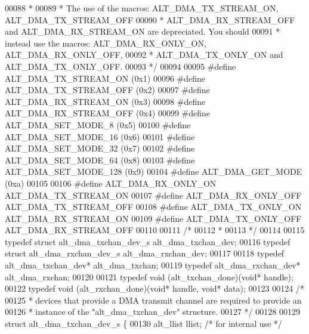 \begin{DoxyCode}
00088 \textcolor{comment}{ *}
00089 \textcolor{comment}{ * The use of the macros: ALT\_DMA\_TX\_STREAM\_ON, ALT\_DMA\_TX\_STREAM\_OFF}
00090 \textcolor{comment}{ * ALT\_DMA\_RX\_STREAM\_OFF and ALT\_DMA\_RX\_STREAM\_ON are depreciated. You should}
00091 \textcolor{comment}{ * instead use the macros: ALT\_DMA\_RX\_ONLY\_ON, ALT\_DMA\_RX\_ONLY\_OFF, }
00092 \textcolor{comment}{ * ALT\_DMA\_TX\_ONLY\_ON and ALT\_DMA\_TX\_ONLY\_OFF.}
00093 \textcolor{comment}{ */}
00094 
00095 \textcolor{preprocessor}{#define ALT\_DMA\_TX\_STREAM\_ON  (0x1)}
00096 \textcolor{preprocessor}{#define ALT\_DMA\_TX\_STREAM\_OFF (0x2)}
00097 \textcolor{preprocessor}{#define ALT\_DMA\_RX\_STREAM\_ON  (0x3)}
00098 \textcolor{preprocessor}{#define ALT\_DMA\_RX\_STREAM\_OFF (0x4)}
00099 \textcolor{preprocessor}{#define ALT\_DMA\_SET\_MODE\_8    (0x5)}
00100 \textcolor{preprocessor}{#define ALT\_DMA\_SET\_MODE\_16   (0x6)}
00101 \textcolor{preprocessor}{#define ALT\_DMA\_SET\_MODE\_32   (0x7)}
00102 \textcolor{preprocessor}{#define ALT\_DMA\_SET\_MODE\_64   (0x8)}
00103 \textcolor{preprocessor}{#define ALT\_DMA\_SET\_MODE\_128  (0x9)}
00104 \textcolor{preprocessor}{#define ALT\_DMA\_GET\_MODE      (0xa)}
00105 
00106 \textcolor{preprocessor}{#define ALT\_DMA\_RX\_ONLY\_ON    ALT\_DMA\_TX\_STREAM\_ON}
00107 \textcolor{preprocessor}{#define ALT\_DMA\_RX\_ONLY\_OFF   ALT\_DMA\_TX\_STREAM\_OFF}
00108 \textcolor{preprocessor}{#define ALT\_DMA\_TX\_ONLY\_ON    ALT\_DMA\_RX\_STREAM\_ON}
00109 \textcolor{preprocessor}{#define ALT\_DMA\_TX\_ONLY\_OFF   ALT\_DMA\_RX\_STREAM\_OFF}
00110 
00111 \textcolor{comment}{/*}
00112 \textcolor{comment}{ *}
00113 \textcolor{comment}{ */}
00114 
00115 \textcolor{keyword}{typedef} \textcolor{keyword}{struct }alt_dma_txchan_dev_s alt_dma_txchan_dev;
00116 \textcolor{keyword}{typedef} \textcolor{keyword}{struct }alt_dma_rxchan_dev_s alt_dma_rxchan_dev;
00117 
00118 \textcolor{keyword}{typedef} alt_dma_txchan_dev* alt_dma_txchan;
00119 \textcolor{keyword}{typedef} alt_dma_rxchan_dev* alt_dma_rxchan;
00120 
00121 \textcolor{keyword}{typedef} void (alt_txchan_done)(\textcolor{keywordtype}{void}* handle);
00122 \textcolor{keyword}{typedef} void (alt_rxchan_done)(\textcolor{keywordtype}{void}* handle, \textcolor{keywordtype}{void}* data);
00123 
00124 \textcolor{comment}{/*}
00125 \textcolor{comment}{ * devices that provide a DMA transmit channel are required to provide an}
00126 \textcolor{comment}{ * instance of the "alt\_dma\_txchan\_dev" structure. }
00127 \textcolor{comment}{ */}
00128 
00129 \textcolor{keyword}{struct }alt_dma_txchan_dev_s \{
00130   alt_llist  llist;                  \textcolor{comment}{/* for internal use */}

\end{DoxyCode}

